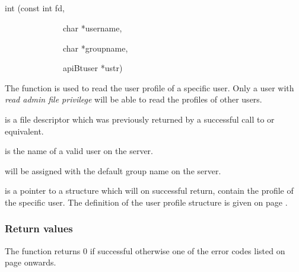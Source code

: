 \subsection{\funcnameXBgetbtu{}}

\begin{expara}

int \funcnameXBgetbtu{}(const int fd,

\ \ \ \ \ \ \ \ \ \ \ \ \ \ char *username,

\ \ \ \ \ \ \ \ \ \ \ \ \ \ char *groupname,

\ \ \ \ \ \ \ \ \ \ \ \ \ \ apiBtuser *ustr)

\end{expara}

The function \funcXBgetbtu{} is used to read the user
profile of a specific user. Only a user with \textit{read admin file
privilege} will be able to read the profiles of other users.

 is a file descriptor which was previously
returned by a successful call to \funcXBopen{} or equivalent.

 is the name of a valid user on the
server.

 will be assigned with the default group
name on the server.

 is a pointer to a structure which will on
successful return, contain the profile of the specific user. The
definition of the user profile structure is given on page
\pageref{bkm:Userstructure}.

\subsubsection{Return values}
The function returns 0 if successful otherwise one of the error codes
listed on page \pageref{errorcodes} onwards.

